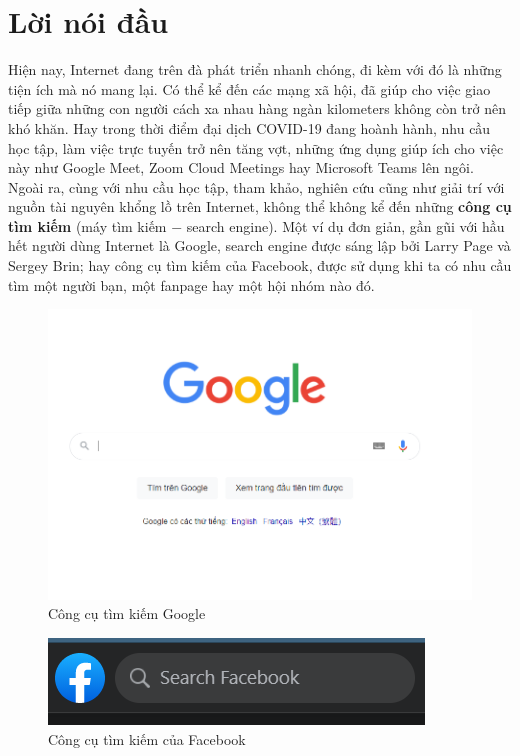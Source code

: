 \documentclass[12pt,a4paper]{article}
\begin{document}
\section{Lời nói đầu}
Hiện nay, Internet đang trên đà phát triển nhanh chóng, đi kèm với đó là những tiện ích mà nó mang lại. Có thể kể đến các mạng xã hội, đã giúp cho việc giao tiếp giữa những con người cách xa nhau hàng ngàn kilometers không còn trở nên khó khăn. Hay trong thời điểm đại dịch COVID-19 đang hoành hành, nhu cầu học tập, làm việc trực tuyến trở nên tăng vợt, những ứng dụng giúp ích cho việc này như Google Meet, Zoom Cloud Meetings hay Microsoft Teams lên ngôi.\\
Ngoài ra, cùng với nhu cầu học tập, tham khảo, nghiên cứu cũng như giải trí với nguồn tài nguyên khổng lồ trên Internet, không thể không kể đến những \textbf{công cụ tìm kiếm} (máy tìm kiếm \(-\) search engine). Một ví dụ đơn giản, gần gũi với hầu hết người dùng Internet là Google, search engine được sáng lập bởi Larry Page và Sergey Brin; hay công cụ tìm kiếm của Facebook, được sử dụng khi ta có nhu cầu tìm một người bạn, một fanpage hay một hội nhóm nào đó.
\begin{figure}[H]
\begin{center}
\includegraphics[scale=0.5]{Fig1}
\end{center}
\caption{Công cụ tìm kiếm Google}
\label{fig1}
\end{figure}
\begin{figure}[H]
\begin{center}
\includegraphics[scale=1]{Fig2}
\end{center}
\caption{Công cụ tìm kiếm của Facebook}
\label{fig2}
\end{figure}
\end{document}
